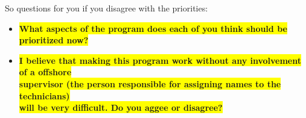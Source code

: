 So questions for you if you disagree with the priorities:
\begin{itemize}
	\item \colorbox{yellow}{\textbf{What aspects of the program does each of you think should be prioritized now?}}
	\item \colorbox{yellow}{\textbf{I believe that making this program work without any involvement of a offshore}}	\\
    	\colorbox{yellow}{\textbf{supervisor (the person responsible for assigning names to the technicians) }} \\
		\colorbox{yellow}{\textbf{will be very difficult. Do you aggee or disagree?}}
\end{itemize} 
